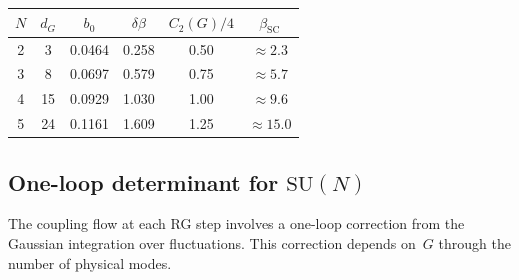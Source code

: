\documentclass[11pt]{article}
\theoremstyle{definition}
\newcommand{\SU}{\mathrm{SU}}
\begin{document}
\begin{center}
\renewcommand{\arraystretch}{1.2}
\begin{tabular}{@{}cccccc@{}}
\toprule
$N$ & $d_G$ & $b_0$ & $\delta\beta$ & $C_2(G)/4$ &
$\beta_{\mathrm{SC}}$ \\
\midrule
2 & 3 & 0.0464 & 0.258 & 0.50 & $\approx 2.3$ \\
3 & 8 & 0.0697 & 0.579 & 0.75 & $\approx 5.7$ \\
4 & 15 & 0.0929 & 1.030 & 1.00 & $\approx 9.6$ \\
5 & 24 & 0.1161 & 1.609 & 1.25 & $\approx 15.0$ \\
\bottomrule
\end{tabular}
\end{center}

\subsection{One-loop determinant for $\SU(N)$}

The coupling flow at each RG step involves a one-loop
correction from the Gaussian integration over
fluctuations.  This correction depends on~$G$ through
the number of physical modes.
\end{document}
